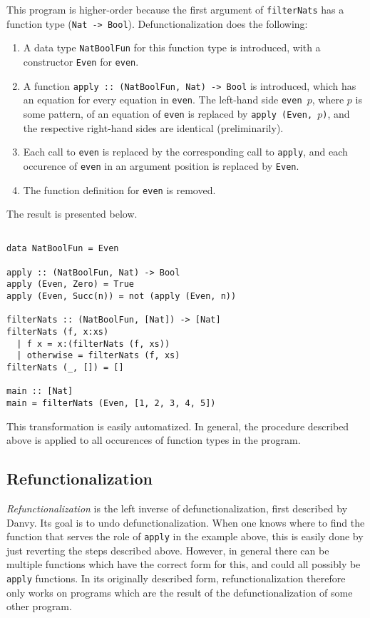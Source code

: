 This program is higher-order because the first argument of \texttt{filterNats} has a function type (\texttt{Nat -> Bool}). Defunctionalization does the following:
\begin{enumerate}
\item  A data type \texttt{NatBoolFun} for this function type is introduced, with a constructor \texttt{Even} for \texttt{even}.
\item A function \texttt{apply :: (NatBoolFun, Nat) -> Bool} is introduced, which has an equation for every equation in \texttt{even}. The left-hand side \texttt{even $p$}, where $p$ is some pattern, of an equation of \texttt{even} is replaced by \texttt{apply (Even, $p$)}, and the respective right-hand sides are identical (preliminarily).
\item Each call to \texttt{even} is replaced by the corresponding call to \texttt{apply}, and each occurence of \texttt{even} in an argument position is replaced by \texttt{Even}.
\item The function definition for \texttt{even} is removed.
\end{enumerate}
The result is presented below.

\begin{lstlisting}

data NatBoolFun = Even

apply :: (NatBoolFun, Nat) -> Bool
apply (Even, Zero) = True
apply (Even, Succ(n)) = not (apply (Even, n))

filterNats :: (NatBoolFun, [Nat]) -> [Nat]
filterNats (f, x:xs)
  | f x = x:(filterNats (f, xs))
  | otherwise = filterNats (f, xs)
filterNats (_, []) = []

main :: [Nat]
main = filterNats (Even, [1, 2, 3, 4, 5])

\end{lstlisting}

This transformation is easily automatized. In general, the procedure described above is applied to all occurences of function types in the program.

\subsection{Refunctionalization}

\textit{Refunctionalization} is the left inverse of defunctionalization, first described by Danvy. Its goal is to undo defunctionalization. When one knows where to find the function that serves the role of \texttt{apply} in the example above, this is easily done by just reverting the steps described above. However, in general there can be multiple functions which have the correct form for this, and could all possibly be \texttt{apply} functions. In its originally described form, refunctionalization therefore only works on programs which are the result of the defunctionalization of some other program.

